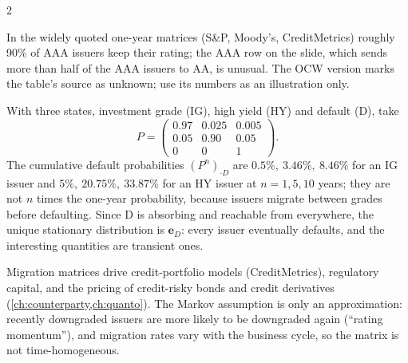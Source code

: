 \begin{paracol}{2}
\begin{coursenote}
In the widely quoted one-year matrices (S\&P, Moody's, CreditMetrics) roughly 90\% of AAA issuers keep
their rating; the AAA row on the slide, which sends more than half of the AAA issuers to AA, is unusual.
The OCW version marks the table's source as unknown; use its numbers as an illustration only.
\end{coursenote}

\begin{example}\label{ch04:ex-credit}
With three states, investment grade (IG), high yield (HY) and default (D), take
\[
  P=\begin{pmatrix}0.97&0.025&0.005\\0.05&0.90&0.05\\0&0&1\end{pmatrix}.
\]
The cumulative default probabilities $(P^n)_{\cdot D}$ are $0.5\%,\ 3.46\%,\ 8.46\%$ for an IG issuer and
$5\%,\ 20.75\%,\ 33.87\%$ for an HY issuer at $n=1,5,10$ years; they are not $n$ times the one-year
probability, because issuers migrate between grades before defaulting. Since D is absorbing and reachable from
everywhere, the unique stationary distribution is $\bm e_D$: every issuer eventually defaults, and the interesting
quantities are transient ones.
\end{example}

\begin{finance}
Migration matrices drive credit-portfolio models (CreditMetrics), regulatory capital, and the pricing of
credit-risky bonds and credit derivatives (\cref{ch:counterparty,ch:quanto}). The Markov assumption is only an
approximation: recently downgraded issuers are more likely to be downgraded again (``rating momentum''),
and migration rates vary with the business cycle, so the matrix is not time-homogeneous.
\end{finance}


\end{paracol}
